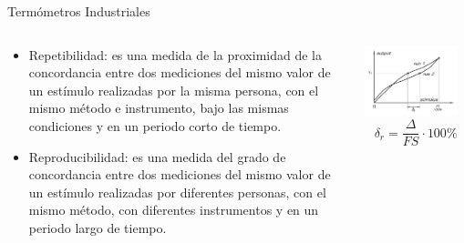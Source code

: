 \documentclass[aspectratio=169]{beamer}
\begin{document}
\begin{frame}{Termómetros Industriales}
    \begin{columns}[c, onlytextwidth]
        \begin{column}{0.60\textwidth}
            \begin{itemize}
                \item Repetibilidad: es una medida de la proximidad de la concordancia entre dos mediciones del mismo valor de un estímulo realizadas por la misma persona, con el mismo método e instrumento, bajo las mismas condiciones y en un periodo corto de tiempo. 
                \item Reproducibilidad: es una medida del grado de concordancia entre dos mediciones del mismo valor de un estímulo realizadas por diferentes personas, con el mismo método, con diferentes instrumentos y en un periodo largo de tiempo. 
            \end{itemize}
        \end{column}
        \begin{column}{0.35\textwidth}
            \includegraphics[width=0.9\textwidth]{fig/repeatibility.png}\cite{Fraden_2016}
            \begin{equation*}
                \delta_r = \dfrac{\Delta}{FS}\cdot 100\%
            \end{equation*}
        \end{column}
    \end{columns}
\end{frame}
\end{document}
